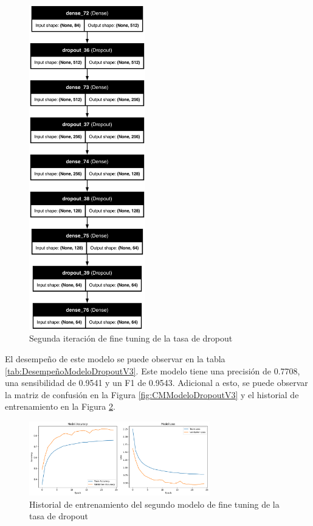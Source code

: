 \begin{figure}[H]
    \centering
    \includegraphics[width=0.45\textwidth]{figuras/modelDropoutV3.png}
    \caption{Segunda iteración de fine tuning de la tasa de dropout}
    \label{fig:ModeloDropoutV3}
\end{figure}

El desempeño de este modelo se puede observar en la tabla \ref{tab:DesempeñoModeloDropoutV3}.
Este modelo tiene una precisión de 0.7708, una sensibilidad de 0.9541 y un F1 de 0.9543.
Adicional a esto, se puede observar la matriz de confusión en la Figura \ref{fig:CMModeloDropoutV3} y el historial de entrenamiento en la Figura \ref{fig:HistoryModeloDropoutV3}.

\begin{figure}[H]
    \centering
    \includegraphics[width=0.7\textwidth]{figuras/modelDropoutV3History.png}
    \caption{Historial de entrenamiento del segundo modelo de fine tuning de la tasa de dropout}
    \label{fig:HistoryModeloDropoutV3}
\end{figure}

